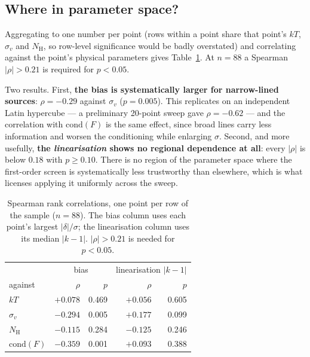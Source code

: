 \documentclass[11pt,a4paper]{article}
\newcommand{\nh}{N_{\mathrm{H}}}
\begin{document}
\subsection{Where in parameter space?}
Aggregating to one number per point (rows within a point share that point's
$kT$, $\sigma_v$ and $\nh$, so row-level significance would be badly
overstated) and correlating against the point's physical parameters gives
Table~\ref{tab:linregions}. At $n=88$ a Spearman $|\rho|>0.21$ is required for
$p<0.05$.

Two results. First, \textbf{the bias is systematically larger for
narrow-lined sources}: $\rho=-0.29$ against $\sigma_v$ ($p=0.005$). This
replicates on an independent Latin hypercube --- a preliminary 20-point sweep
gave $\rho=-0.62$ --- and the correlation with $\mathrm{cond}(F)$ is the same
effect, since broad lines carry less information and worsen the conditioning
while enlarging $\sigma$. Second, and more usefully, \textbf{the
\emph{linearisation} shows no regional dependence at all}: every $|\rho|$ is
below $0.18$ with $p\ge0.10$. There is no region of the parameter space where
the first-order screen is systematically less trustworthy than elsewhere,
which is what licenses applying it uniformly across the sweep.

\begin{table}[htbp]
\centering
\caption{Spearman rank correlations, one point per row of the sample ($n=88$).
The bias column uses each point's largest $|\delta|/\sigma$; the linearisation
column uses its median $|k-1|$. $|\rho|>0.21$ is needed for $p<0.05$.}
\label{tab:linregions}
\begin{tabular}{lrrrr}
\toprule
& \multicolumn{2}{c}{bias} & \multicolumn{2}{c}{linearisation $|k-1|$} \\
against & $\rho$ & $p$ & $\rho$ & $p$ \\
\midrule
$kT$              & $+0.078$ & 0.469 & $+0.056$ & 0.605 \\
$\sigma_v$        & $-0.294$ & 0.005 & $+0.177$ & 0.099 \\
$\nh$             & $-0.115$ & 0.284 & $-0.125$ & 0.246 \\
$\mathrm{cond}(F)$ & $-0.359$ & 0.001 & $+0.093$ & 0.388 \\
\bottomrule
\end{tabular}
\end{table}
\end{document}
